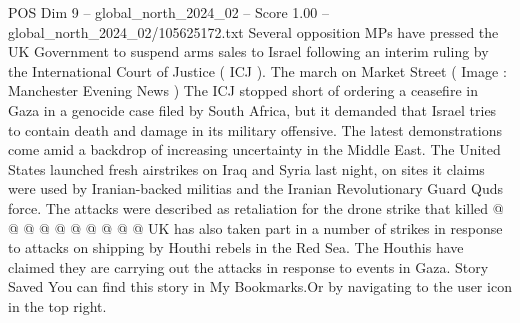 \begin{textsample}{POS Dim 9 – global\_north\_2024\_02 – Score 1.00 – global\_north\_2024\_02/105625172.txt}
Several opposition MPs have pressed the UK Government to suspend arms sales to Israel following an interim ruling by the International Court of Justice ( ICJ ).
The march on Market Street ( Image : Manchester Evening News ) The ICJ stopped short of ordering a ceasefire in Gaza in a genocide case filed by South Africa, but it demanded that Israel tries to contain death and damage in its military offensive.
The latest demonstrations come amid a backdrop of increasing uncertainty in the Middle East.
The United States launched fresh airstrikes on Iraq and Syria last night, on sites it claims were used by Iranian-backed militias and the Iranian Revolutionary Guard Quds force.
The attacks were described as retaliation for the drone strike that killed @ @ @ @ @ @ @ @ @ @ UK has also taken part in a number of strikes in response to attacks on shipping by Houthi rebels in the Red Sea.
The Houthis have claimed they are carrying out the attacks in response to events in Gaza.
Story Saved You can find this story in My Bookmarks.Or by navigating to the user icon in the top right.

\end{textsample}
